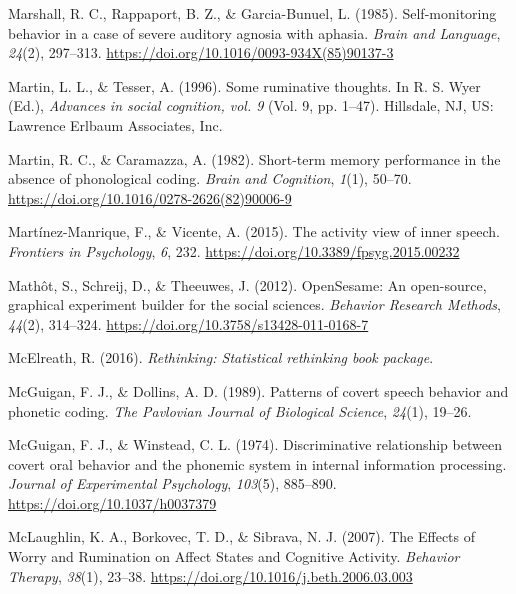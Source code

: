 \documentclass[a4paper,12pt,twoside,openright,oldfontcommands]{memoir}
\begin{document}
\leavevmode\hypertarget{ref-marshall_self-monitoring_1985}{}%
Marshall, R. C., Rappaport, B. Z., \& Garcia-Bunuel, L. (1985). Self-monitoring behavior in a case of severe auditory agnosia with aphasia. \emph{Brain and Language}, \emph{24}(2), 297--313. \url{https://doi.org/10.1016/0093-934X(85)90137-3}

\leavevmode\hypertarget{ref-Martin}{}%
Martin, L. L., \& Tesser, A. (1996). Some ruminative thoughts. In R. S. Wyer (Ed.), \emph{Advances in social cognition, vol. 9} (Vol. 9, pp. 1--47). Hillsdale, NJ, US: Lawrence Erlbaum Associates, Inc.

\leavevmode\hypertarget{ref-martin_short-term_1982}{}%
Martin, R. C., \& Caramazza, A. (1982). Short-term memory performance in the absence of phonological coding. \emph{Brain and Cognition}, \emph{1}(1), 50--70. \url{https://doi.org/10.1016/0278-2626(82)90006-9}

\leavevmode\hypertarget{ref-Martinez-Manrique2015}{}%
Martínez-Manrique, F., \& Vicente, A. (2015). The activity view of inner speech. \emph{Frontiers in Psychology}, \emph{6}, 232. \url{https://doi.org/10.3389/fpsyg.2015.00232}

\leavevmode\hypertarget{ref-mathot_opensesame:_2012}{}%
Mathôt, S., Schreij, D., \& Theeuwes, J. (2012). OpenSesame: An open-source, graphical experiment builder for the social sciences. \emph{Behavior Research Methods}, \emph{44}(2), 314--324. \url{https://doi.org/10.3758/s13428-011-0168-7}

\leavevmode\hypertarget{ref-R-rethinking}{}%
McElreath, R. (2016). \emph{Rethinking: Statistical rethinking book package}.

\leavevmode\hypertarget{ref-mcguigan_patterns_1989}{}%
McGuigan, F. J., \& Dollins, A. D. (1989). Patterns of covert speech behavior and phonetic coding. \emph{The Pavlovian Journal of Biological Science}, \emph{24}(1), 19--26.

\leavevmode\hypertarget{ref-mcguigan_discriminative_1974}{}%
McGuigan, F. J., \& Winstead, C. L. (1974). Discriminative relationship between covert oral behavior and the phonemic system in internal information processing. \emph{Journal of Experimental Psychology}, \emph{103}(5), 885--890. \url{https://doi.org/10.1037/h0037379}

\leavevmode\hypertarget{ref-mclaughlin_effects_2007}{}%
McLaughlin, K. A., Borkovec, T. D., \& Sibrava, N. J. (2007). The Effects of Worry and Rumination on Affect States and Cognitive Activity. \emph{Behavior Therapy}, \emph{38}(1), 23--38. \url{https://doi.org/10.1016/j.beth.2006.03.003}
\end{document}
